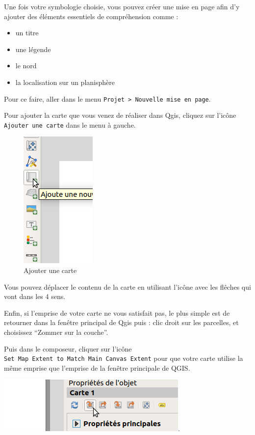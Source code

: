 Une fois votre symbologie choisie, vous pouvez créer une mise en page
afin d'y ajouter des éléments essentiels de compréhension comme :

\begin{itemize}
\tightlist
\item
  un titre
\item
  une légende
\item
  le nord
\item
  la localisation sur un planisphère
\end{itemize}

Pour ce faire, aller dans le menu
\texttt{Projet\ \textgreater{}\ Nouvelle\ mise\ en\ page}.

Pour ajouter la carte que vous venez de réaliser dans Qgis, cliquez sur
l'icône \texttt{Ajouter\ une\ carte} dans le menu à gauche.

\begin{figure}
\centering
\includegraphics{figures/composer_addMap.png}
\caption{Ajouter une carte}
\end{figure}

Vous pouvez déplacer le contenu de la carte en utilisant l'icône avec
les flêches qui vont dans les 4 sens.

Enfin, si l'emprise de votre carte ne vous satisfait pas, le plus simple
est de retourner dans la fenêtre principal de Qgis puis : clic droit sur
les parcelles, et choisissez ``Zommer sur la couche''.

Puis dans le composeur, cliquer sur l'icône
\texttt{Set\ Map\ Extent\ to\ Match\ Main\ Canvas\ Extent} pour que
votre carte utilise la même emprise que l'emprise de la fenêtre
principale de QGIS.

\includegraphics{figures/composer_mapExtent.png}.

